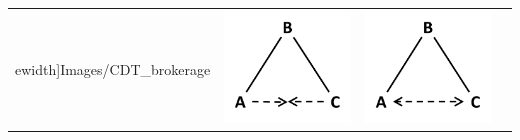 \begin{table}[]
\begin{tabularx}{\textwidth}{>{\raggedright}p{3.5cm}>{\raggedright}p{3.5cm}>{\raggedright}p{3.5cm}>{\raggedright}p{3.5cm}}
ewidth]{Images/CDT_brokerage} \end{minipage}  & \begin{minipage}{.2\textwidth} \centering \includegraphics[width=0.7\linewidth]{Images/TG_brokerage_1} \end{minipage}  & \begin{minipage}{.2\textwidth} \centering \includegraphics[width=0.7\linewidth]{Images/TI_brokerage} \end{minipage}   \\

\end{tabularx}
\end{table}
